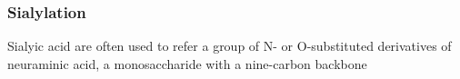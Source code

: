 \subsubsection {Sialylation}
Sialyic acid are often used to refer a group of N- or O-substituted derivatives of neuraminic acid, a monosaccharide with a nine-carbon backbone